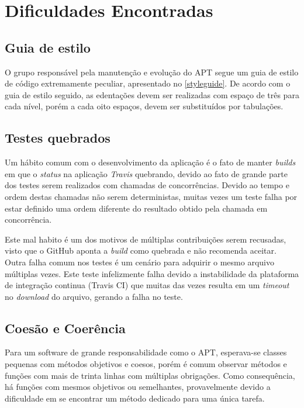 \chapter{Dificuldades Encontradas} %
\label{cha:dificuldades_encontradas}

\section*{Guia de estilo} %
\label{sec:guia_de_estilo}

O grupo responsável pela manutenção e evolução do APT segue um guia de estilo de código extremamente peculiar, apresentado no \autoref{styleguide}. De acordo com o guia de estilo seguido, as edentações devem ser realizadas com espaço de três para cada nível, porém a cada oito espaços, devem ser substituídos por tabulações.

\section*{Testes quebrados} %
\label{sec:testes_de_concorr_ncias}

Um hábito comum com o desenvolvimento da aplicação é o fato de manter \textit{builds} em que o \textit{status} na aplicação \textit{Travis} quebrando, devido ao fato de grande parte dos testes serem realizados com chamadas de concorrências. Devido ao tempo e ordem destas chamadas não serem deterministas, muitas vezes um teste falha por estar definido uma ordem diferente do resultado obtido pela chamada em concorrência.

Este mal habito é um dos motivos de múltiplas contribuições serem recusadas, visto que o GitHub aponta a \textit{build} como quebrada e não recomenda aceitar. Outra falha comum nos testes é um cenário para adquirir o mesmo arquivo múltiplas vezes. Este teste infelizmente falha devido a instabilidade da plataforma de integração continua (Travis CI) que muitas das vezes resulta em um \textit{timeout} no \textit{download} do arquivo, gerando a falha no teste.


\section*{Coesão e Coerência} %
\label{sec:coes_o_e_coer_ncia}

Para um software de grande responsabilidade como o APT, esperava-se classes pequenas com métodos objetivos e coesos, porém é comum observar métodos e funções com mais de trinta linhas com múltiplas obrigações. Como consequência, há funções com mesmos objetivos ou semelhantes, provavelmente devido a dificuldade em se encontrar um método dedicado para uma única tarefa.

